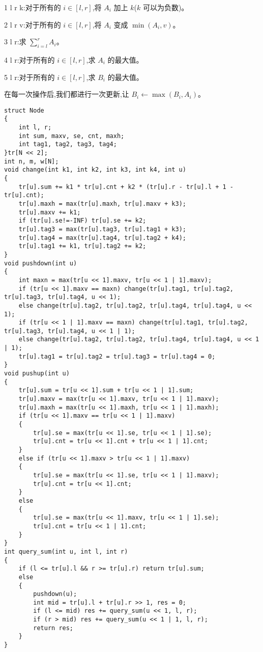 \documentclass[a4paper,fontset=none]{ctexart}
\begin{document}
1 l r k:对于所有的 $i\in[l,r]$,将 $A_i$ 加上 $k$($k$ 可以为负数)。

2 l r v:对于所有的 $i\in[l,r]$,将 $A_i$ 变成 $\min(A_i,v)$。

3 l r:求 $\sum_{i=l}^{r}A_i$。

4 l r:对于所有的 $i\in[l,r]$,求 $A_i$ 的最大值。

5 l r:对于所有的 $i\in[l,r]$,求 $B_i$ 的最大值。

在每一次操作后,我们都进行一次更新,让 $B_i\gets\max(B_i,A_i)$。

\begin{verbatim}
struct Node
{
    int l, r;
    int sum, maxv, se, cnt, maxh;
    int tag1, tag2, tag3, tag4;
}tr[N << 2];
int n, m, w[N];
void change(int k1, int k2, int k3, int k4, int u)
{
    tr[u].sum += k1 * tr[u].cnt + k2 * (tr[u].r - tr[u].l + 1 - tr[u].cnt);
    tr[u].maxh = max(tr[u].maxh, tr[u].maxv + k3);
    tr[u].maxv += k1;
    if (tr[u].se!=-INF) tr[u].se += k2;
    tr[u].tag3 = max(tr[u].tag3, tr[u].tag1 + k3);
    tr[u].tag4 = max(tr[u].tag4, tr[u].tag2 + k4);
    tr[u].tag1 += k1, tr[u].tag2 += k2;
}
void pushdown(int u)
{
    int maxn = max(tr[u << 1].maxv, tr[u << 1 | 1].maxv);
    if (tr[u << 1].maxv == maxn) change(tr[u].tag1, tr[u].tag2, tr[u].tag3, tr[u].tag4, u << 1);
    else change(tr[u].tag2, tr[u].tag2, tr[u].tag4, tr[u].tag4, u << 1);
    if (tr[u << 1 | 1].maxv == maxn) change(tr[u].tag1, tr[u].tag2, tr[u].tag3, tr[u].tag4, u << 1 | 1);
    else change(tr[u].tag2, tr[u].tag2, tr[u].tag4, tr[u].tag4, u << 1 | 1);
    tr[u].tag1 = tr[u].tag2 = tr[u].tag3 = tr[u].tag4 = 0;
}
void pushup(int u)
{
    tr[u].sum = tr[u << 1].sum + tr[u << 1 | 1].sum;
    tr[u].maxv = max(tr[u << 1].maxv, tr[u << 1 | 1].maxv);
    tr[u].maxh = max(tr[u << 1].maxh, tr[u << 1 | 1].maxh);
    if (tr[u << 1].maxv == tr[u << 1 | 1].maxv)
    {
        tr[u].se = max(tr[u << 1].se, tr[u << 1 | 1].se);
        tr[u].cnt = tr[u << 1].cnt + tr[u << 1 | 1].cnt;
    }
    else if (tr[u << 1].maxv > tr[u << 1 | 1].maxv)
    {
        tr[u].se = max(tr[u << 1].se, tr[u << 1 | 1].maxv);
        tr[u].cnt = tr[u << 1].cnt;
    }
    else
    {
        tr[u].se = max(tr[u << 1].maxv, tr[u << 1 | 1].se);
        tr[u].cnt = tr[u << 1 | 1].cnt;
    }
}
int query_sum(int u, int l, int r)
{
    if (l <= tr[u].l && r >= tr[u].r) return tr[u].sum;
    else
    {
        pushdown(u);
        int mid = tr[u].l + tr[u].r >> 1, res = 0;
        if (l <= mid) res += query_sum(u << 1, l, r);
        if (r > mid) res += query_sum(u << 1 | 1, l, r);
        return res;
    }
}

\end{verbatim}
\end{document}

